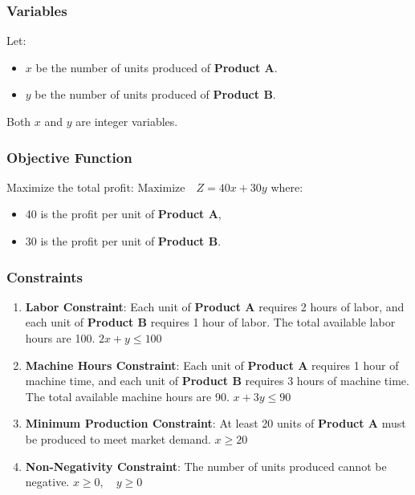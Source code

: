 \documentclass [version=final]{iacrcc}
\begin{document}
\subsubsection{Variables}
Let:
\begin{itemize}
    \item $x$ be the number of units produced of \textbf{Product A}.
    \item $y$ be the number of units produced of \textbf{Product B}.
\end{itemize}

Both $x$ and $y$ are integer variables.

\subsubsection{Objective Function}
Maximize the total profit:
$
\text{Maximize} \quad Z = 40x + 30y
$
where:
\begin{itemize}
    \item 40 is the profit per unit of \textbf{Product A},
    \item 30 is the profit per unit of \textbf{Product B}.
\end{itemize}

\subsubsection{Constraints}
\begin{enumerate}
    \item \textbf{Labor Constraint}: Each unit of \textbf{Product A} requires 2 hours of labor, and each unit of \textbf{Product B} requires 1 hour of labor. The total available labor hours are 100.
    $
    2x + y \leq 100
    $
    
    \item \textbf{Machine Hours Constraint}: Each unit of \textbf{Product A} requires 1 hour of machine time, and each unit of \textbf{Product B} requires 3 hours of machine time. The total available machine hours are 90.
    $
    x + 3y \leq 90
    $
    
    \item \textbf{Minimum Production Constraint}: At least 20 units of \textbf{Product A} must be produced to meet market demand.
    $
    x \geq 20
    $
    
    \item \textbf{Non-Negativity Constraint}: The number of units produced cannot be negative.
    $
    x \geq 0, \quad y \geq 0
    $
\end{enumerate}
\end{document}
